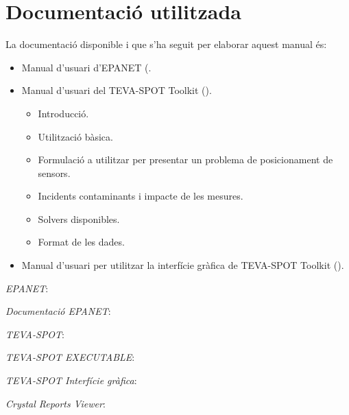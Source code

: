 \documentclass[12pt]{article}
\begin{document}
\clearpage
\section{Documentació utilitzada}
La documentació disponible i que s'ha seguit per elaborar aquest manual és:
\begin{itemize}
	\item Manual d'usuari d'EPANET (.
	\item Manual d'usuari del TEVA-SPOT Toolkit ().
	\begin{itemize}
		\item Introducció.
		\item Utilització bàsica.
		\item Formulació a utilitzar per presentar un problema de posicionament de sensors.
		\item Incidents contaminants i impacte de les mesures.
		\item Solvers disponibles.
		\item Format de les dades.
	\end{itemize}
	\item Manual d'usuari per utilitzar la interfície gràfica de TEVA-SPOT Toolkit ().
\end{itemize}




\clearpage
\begin{thebibliography}{9}
	\textit{EPANET}:
  	\\
  	
  	\textit{Documentació EPANET}:
  	\\
  	
	\textit{TEVA-SPOT}:
  	\\

  	\textit{TEVA-SPOT EXECUTABLE}:
  	\\

	\textit{TEVA-SPOT Interfície gràfica}:
  	\\
  	
	\textit{Crystal Reports Viewer}:
  	\\
\end{thebibliography}
\end{document}
